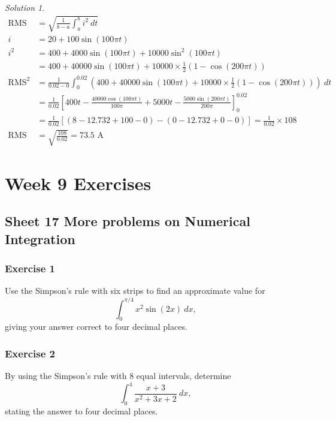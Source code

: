 \documentclass[
  11pt,
  oneside]{book}
\newcommand{\slide}{}
\theoremstyle{definition}
\theoremstyle{definition}
\theoremstyle{definition}
\theoremstyle{definition}
\theoremstyle{remark}
\newtheorem*{solution}{Solution}
\begin{document}
\begin{solution}
\begin{align*}
\text{RMS}&= \sqrt{\frac{1}{b-a}\int_a^b i^2\ dt}\\
i&=20+100\sin(100\pi t)\\
i^2&=400+4000\sin(100\pi t)+10000\sin^2(100\pi t)\\
&=400+40000\sin(100\pi t)+10000\times\frac 12(1-\cos(200\pi t))\\
\text{RMS}^2&=\frac1{0.02-0}\int_0^{0.02}(400+40000\sin(100\pi t)+10000\times\frac 12(1-\cos(200\pi t)))\ dt\\
&=\frac1{0.02}\left[400t-\frac{40000\cos(100\pi t)}{100\pi}+5000t-\frac{5000\sin(200\pi t)}{200\pi}\right]_0^{0.02}\\
&=\frac1{0.02}\left[(8-12.732+100-0)-(0-12.732+0-0)\right] = \frac1{0.02}\times108\\
\text{RMS}&=\sqrt{\frac{108}{0.02}}=73.5\text{ A}
\end{align*}
\end{solution}

\chapter*{Week 9 Exercises}\label{week-9-exercises}

\section{Sheet 17 More problems on Numerical Integration}\label{sheet-17-more-problems-on-numerical-integration}

\slide

\subsection*{Exercise 1}\label{exercise-1-8}

Use the Simpson's rule with six strips to find an approximate value for
\[
\int_0^{\pi/4}x^2\sin(2x)\ dx,
\]
giving your answer correct to four decimal places.

\slide

\subsection*{Exercise 2}\label{exercise-2-8}

By using the Simpson's rule with 8 equal intervals, determine
\[
\int_0^4\frac{x+3}{x^2+3x+2}\ dx,
\]
stating the answer to four decimal places.
\end{document}
